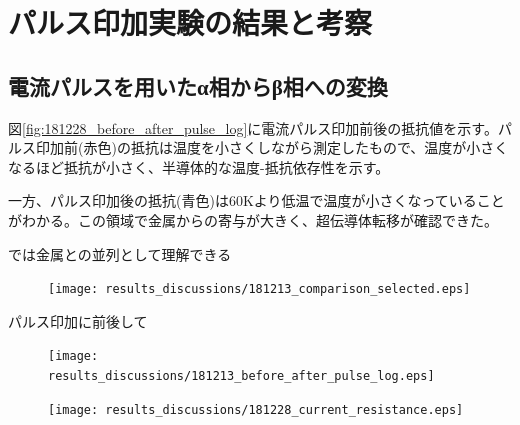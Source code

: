 \section{パルス印加実験の結果と考察}

\subsection{電流パルスを用いたα相からβ相への変換}
図\ref{fig:181228_before_after_pulse_log}に電流パルス印加前後の抵抗値を示す。パルス印加前(赤色)の抵抗は温度を小さくしながら測定したもので、温度が小さくなるほど抵抗が小さく、半導体的な温度-抵抗依存性を示す。

一方、パルス印加後の抵抗(青色)は60Kより低温で温度が小さくなっていることがわかる。この領域で金属からの寄与が大きく、超伝導体転移が確認できた。

では金属との並列として理解できる\cite{Mayr,McLachlan}

  \begin{figure}[!h]
    \begin{center}
   \texttt{[image: results\_discussions/181213\_comparison\_selected.eps]}
  \end{center}
  \caption{}
  \label{fig:181213_comparison_selected.eps}
  \end{figure}

パルス印加に前後して
\begin{figure}[!h]
    \begin{center}
   \texttt{[image: results\_discussions/181213\_before\_after\_pulse\_log.eps]}
  \end{center}
  \caption{}
  \label{fig:181213_before_after_pulse_log}
  \end{figure}

\begin{figure}[!h]
    \begin{center}
   \texttt{[image: results\_discussions/181228\_current\_resistance.eps]}
  \end{center}
  \caption{}
  \label{fig:181228_current_resistance.eps}
  \end{figure}

